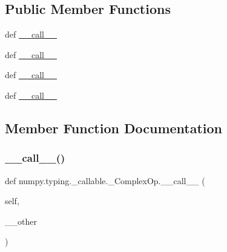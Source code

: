 \subsection*{Public Member Functions}
\begin{DoxyCompactItemize}
\item 
def \hyperlink{classnumpy_1_1typing_1_1__callable_1_1__ComplexOp_a65b9a38085f4bc6efdd767e2dc8418a8}{\+\_\+\+\_\+call\+\_\+\+\_\+}
\item 
def \hyperlink{classnumpy_1_1typing_1_1__callable_1_1__ComplexOp_a65b9a38085f4bc6efdd767e2dc8418a8}{\+\_\+\+\_\+call\+\_\+\+\_\+}
\item 
def \hyperlink{classnumpy_1_1typing_1_1__callable_1_1__ComplexOp_a65b9a38085f4bc6efdd767e2dc8418a8}{\+\_\+\+\_\+call\+\_\+\+\_\+}
\item 
def \hyperlink{classnumpy_1_1typing_1_1__callable_1_1__ComplexOp_a65b9a38085f4bc6efdd767e2dc8418a8}{\+\_\+\+\_\+call\+\_\+\+\_\+}
\end{DoxyCompactItemize}


\subsection{Member Function Documentation}
\mbox{\label{classnumpy_1_1typing_1_1__callable_1_1__ComplexOp_a65b9a38085f4bc6efdd767e2dc8418a8}} 
\subsubsection{\texorpdfstring{\+\_\+\+\_\+call\+\_\+\+\_\+()}{\_\_call\_\_()}\hspace{0.1cm}{\footnotesize\ttfamily [1/4]}}
{\footnotesize\ttfamily def numpy.\+typing.\+\_\+callable.\+\_\+\+Complex\+Op.\+\_\+\+\_\+call\+\_\+\+\_\+ (\begin{DoxyParamCaption}\item[{}]{self,  }\item[{}]{\+\_\+\+\_\+other }\end{DoxyParamCaption})}

\mbox{\label{classnumpy_1_1typing_1_1__callable_1_1__ComplexOp_a65b9a38085f4bc6efdd767e2dc8418a8}} 
